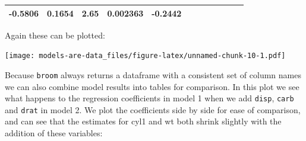 \documentclass[]{article}
\newenvironment{Shaded}{\begin{snugshade}}{\end{snugshade}}
\newcommand{\KeywordTok}[1]{\textcolor[rgb]{0.13,0.29,0.53}{\textbf{#1}}}
\newcommand{\DataTypeTok}[1]{\textcolor[rgb]{0.13,0.29,0.53}{#1}}
\newcommand{\DecValTok}[1]{\textcolor[rgb]{0.00,0.00,0.81}{#1}}
\newcommand{\StringTok}[1]{\textcolor[rgb]{0.31,0.60,0.02}{#1}}
\newcommand{\OperatorTok}[1]{\textcolor[rgb]{0.81,0.36,0.00}{\textbf{#1}}}
\newcommand{\NormalTok}[1]{#1}
\theoremstyle{definition}
\theoremstyle{definition}
\theoremstyle{definition}
\theoremstyle{remark}
\begin{document}
\begin{longtable}[]{@{}cccccccccccc@{}}
\begin{minipage}[t]{0.05\columnwidth}
-0.5806\strut
\end{minipage} & \begin{minipage}[t]{0.05\columnwidth}\centering\strut
0.1654\strut
\end{minipage} & \begin{minipage}[t]{0.05\columnwidth}\centering\strut
2.65\strut
\end{minipage} & \begin{minipage}[t]{0.06\columnwidth}\centering\strut
0.002363\strut
\end{minipage} & \begin{minipage}[t]{0.06\columnwidth}\centering\strut
-0.2442\strut
\end{minipage}\tabularnewline
\bottomrule
\end{longtable}

Again these can be plotted:

\begin{Shaded}
\end{Shaded}

\texttt{[image: models-are-data\_files/figure-latex/unnamed-chunk-10-1.pdf]}

Because \texttt{broom} always returns a dataframe with a consistent set
of column names we can also combine model results into tables for
comparison. In this plot we see what happens to the regression
coefficients in model 1 when we add \texttt{disp}, \texttt{carb} and
\texttt{drat} in model 2. We plot the coefficients side by side for ease
of comparison, and can see that the estimates for cyl1 and wt both
shrink slightly with the addition of these variables:
\end{document}

